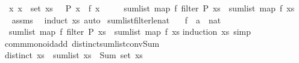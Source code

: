 \begin{isabellebody}
\ \ \ {\isachardoublequoteopen}{\isasymAnd}x{\isachardot}{\kern0pt}\ x\ {\isasymin}\ set\ xs\ {\isasymLongrightarrow}\ {\isasymnot}\ P\ x\ {\isasymLongrightarrow}\ f\ x\ {\isacharequal}{\kern0pt}\ {}{\isachardoublequoteclose}\isanewline
\ \ \ {\isachardoublequoteopen}sum{\isacharunderscore}{\kern0pt}list\ {\isacharparenleft}{\kern0pt}map\ f\ {\isacharparenleft}{\kern0pt}filter\ P\ xs{\isacharparenright}{\kern0pt}{\isacharparenright}{\kern0pt}\ {\isacharequal}{\kern0pt}\ sum{\isacharunderscore}{\kern0pt}list\ {\isacharparenleft}{\kern0pt}map\ f\ xs{\isacharparenright}{\kern0pt}{\isachardoublequoteclose}\isanewline
%
\isadelimproof
\ \ %
\endisadelimproof
%
\isatagproof
{}\isamarkupfalse%
\ assms\ \isamarkupfalse%
\ {\isacharparenleft}{\kern0pt}induct\ xs{\isacharparenright}{\kern0pt}\ auto%
\endisatagproof
{\isafoldproof}%
%
\isadelimproof
\isanewline
%
\endisadelimproof
\isanewline
{}\isamarkupfalse%
\ sum{\isacharunderscore}{\kern0pt}list{\isacharunderscore}{\kern0pt}filter{\isacharunderscore}{\kern0pt}le{\isacharunderscore}{\kern0pt}nat{\isacharcolon}{\kern0pt}\isanewline
\ \ \ f\ {\isacharcolon}{\kern0pt}{\isacharcolon}{\kern0pt}\ {\isachardoublequoteopen}{\isacharprime}{\kern0pt}a\ {\isasymRightarrow}\ nat{\isachardoublequoteclose}\isanewline
\ \ \ {\isachardoublequoteopen}sum{\isacharunderscore}{\kern0pt}list\ {\isacharparenleft}{\kern0pt}map\ f\ {\isacharparenleft}{\kern0pt}filter\ P\ xs{\isacharparenright}{\kern0pt}{\isacharparenright}{\kern0pt}\ {\isasymle}\ sum{\isacharunderscore}{\kern0pt}list\ {\isacharparenleft}{\kern0pt}map\ f\ xs{\isacharparenright}{\kern0pt}{\isachardoublequoteclose}\isanewline
%
\isadelimproof
%
\endisadelimproof
%
\isatagproof
{}\isamarkupfalse%
{\isacharparenleft}{\kern0pt}induction\ xs{\isacharsemicolon}{\kern0pt}\ simp{\isacharparenright}{\kern0pt}%
\endisatagproof
{\isafoldproof}%
%
\isadelimproof
\isanewline
%
\endisadelimproof
\isanewline
{}\isamarkupfalse%
\ {\isacharparenleft}{\kern0pt}\ comm{\isacharunderscore}{\kern0pt}monoid{\isacharunderscore}{\kern0pt}add{\isacharparenright}{\kern0pt}\ distinct{\isacharunderscore}{\kern0pt}sum{\isacharunderscore}{\kern0pt}list{\isacharunderscore}{\kern0pt}conv{\isacharunderscore}{\kern0pt}Sum{\isacharcolon}{\kern0pt}\isanewline
\ \ {\isachardoublequoteopen}distinct\ xs\ {\isasymLongrightarrow}\ sum{\isacharunderscore}{\kern0pt}list\ xs\ {\isacharequal}{\kern0pt}\ Sum\ {\isacharparenleft}{\kern0pt}set\ xs{\isacharparenright}{\kern0pt}{\isachardoublequoteclose}\isanewline

\end{isabellebody}

